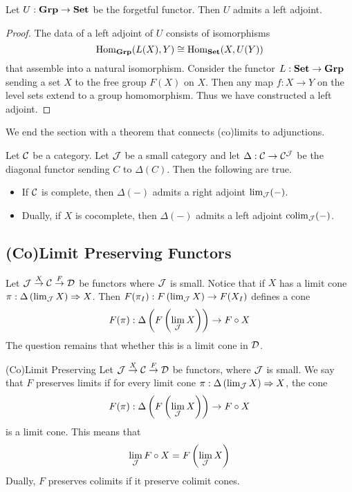 \documentclass[a4paper]{article}
\begin{document}
\begin{prp}{}{} Let $U:\bold{Grp}\to\bold{Set}$ be the forgetful functor. Then $U$ admits a left adjoint. \tcbline
\begin{proof}
The data of a left adjoint of $U$ consists of isomorphisms $$\operatorname{Hom}_\bold{Grp}(L(X),Y)\cong\operatorname{Hom}_\bold{Set}(X,U(Y))$$ that assemble into a natural isomorphism. Consider the functor $L:\bold{Set}\to\bold{Grp}$ sending a set $X$ to the free group $F(X)$ on $X$. Then any map $f:X\to Y$ on the level sets extend to a group homomorphism. Thus we have constructed a left adjoint. 
\end{proof}
\end{prp}

We end the section with a theorem that connects (co)limits to adjunctions. 

\begin{thm}{}{} Let $\mathcal{C}$ be a category. Let $\mathcal{J}$ be a small category and let $\Delta:\mathcal{C}\to\mathcal{C}^{\mathcal{J}}$ be the diagonal functor sending $C$ to $\Delta(C)$. Then the following are true. 
\begin{itemize}
\item If $\mathcal{C}$ is complete, then $\Delta(-)$ admits a right adjoint $\lim_{\mathcal{J}}(-)$. 
\item Dually, if $X$ is cocomplete, then $\Delta(-)$ admits a left adjoint $\operatorname*{colim}_{\mathcal{J}}(-)$. 
\end{itemize}
\end{thm}

\subsection{(Co)Limit Preserving Functors}
Let $\mathcal{J}\overset{X}{\to}\mathcal{C}\overset{F}{\to}\mathcal{D}$ be functors where $\mathcal{J}$ is small. Notice that if $X$ has a limit cone $\pi:\Delta\left(\lim_{\mathcal{J}} X\right)\Rightarrow X$. Then $F(\pi_I):F\left(\lim_{\mathcal{J}} X\right)\to F(X_I)$ defines a cone $$F(\pi):\Delta\left(F\left(\lim_{\mathcal{J}} X\right)\right)\to F\circ X$$ 
The question remains that whether this is a limit cone in $\mathcal{D}$. 

\begin{defn}{(Co)Limit Preserving}{} Let $\mathcal{J}\overset{X}{\to}\mathcal{C}\overset{F}{\to}\mathcal{D}$ be functors, where $\mathcal{J}$ is small. We say that $F$ preserves limits if for every limit cone $\pi:\Delta\left(\lim_{\mathcal{J}} X\right)\Rightarrow X$, the cone $$F(\pi):\Delta\left(F\left(\lim_{\mathcal{J}} X\right)\right)\to F\circ X$$ is a limit cone. This means that $$\lim_{\mathcal{J}} F\circ X=F\left(\lim_{\mathcal{J}} X\right)$$ Dually, $F$ preserves colimits if it preserve colimit cones. 
\end{defn}
\end{document}
